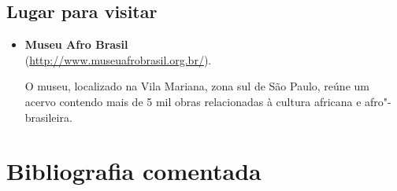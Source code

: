 \documentclass[11pt]{extarticle}
\begin{document}
\subsection{Lugar para visitar}

\begin{itemize}
\item\textbf{Museu Afro Brasil}\\
(\url{http://www.museuafrobrasil.org.br/}).

O museu, localizado na Vila Mariana, zona sul de São Paulo, reúne um
acervo contendo mais de 5 mil obras relacionadas à cultura africana e
afro"-brasileira.
\end{itemize}

\section{Bibliografia comentada}
\end{document}
